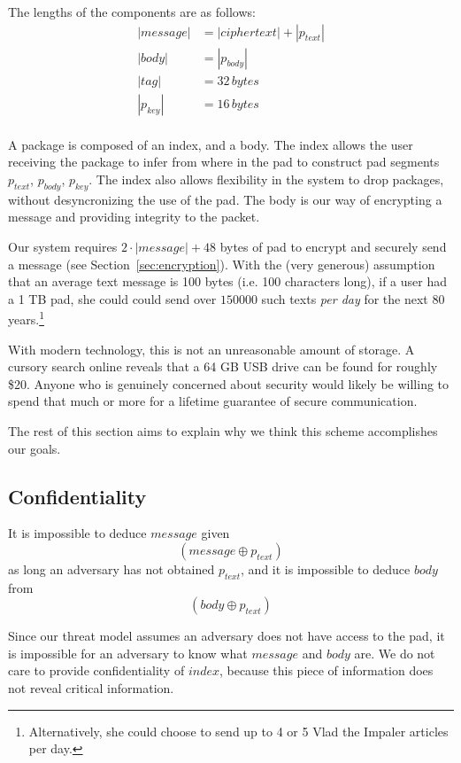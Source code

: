 \documentclass[twocolumn]{article}
\begin{document}
The lengths of the components are as follows:
\begin{align*}
|message| &= |ciphertext|+|p_{text}|\\
|body| &= |p_{body}| \\
|tag| &= 32\, bytes \\
|p_{key}| &= 16\, bytes \\
\end{align*}

A package is composed of an index, and a body. The index allows the user receiving the package to infer from where in the pad to construct pad segments $p_{text}$, $p_{body}$, $p_{key}$. The index also allows flexibility in the system to drop packages, without desyncronizing the use of the pad. The body is our way of encrypting a message and providing integrity to the packet.

Our system requires $2\cdot |message| + 48$ bytes of pad to encrypt and securely send a message (see Section~\ref{sec:encryption}). With the (very generous) assumption that an average text message is 100 bytes (i.e. 100 characters long), if a user had a 1 TB pad, she could could send over $150000$ such texts \emph{per day} for the next 80 years.\footnote{
Alternatively, she could choose to send up to 4 or 5 Vlad the Impaler articles per day.
}

With modern technology, this is not an unreasonable amount of storage. A cursory search online reveals that a 64 GB USB drive can be found for roughly \$20. Anyone who is genuinely concerned about security would likely be willing to spend that much or more for a lifetime guarantee of secure communication.

The rest of this section aims to explain why we think this scheme accomplishes our goals.

\subsection{Confidentiality}
It is impossible to deduce $message$ given
\[
(message \oplus p_{text})
\]
as long an adversary has not obtained $p_{text}$, and it is impossible to deduce $body$ from
\[
(body \oplus p_{text})
\]

Since our threat model assumes an adversary does not have access to the pad, it is impossible for an adversary to know what $message$ and $body$ are. We do not care to provide confidentiality of $index$, because this piece of information does not reveal critical information. 
\end{document}
